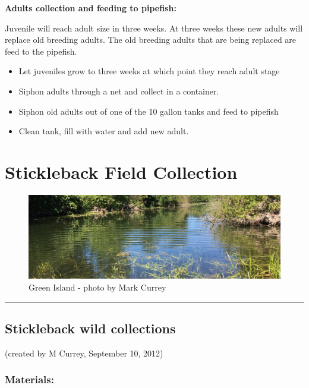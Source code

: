\documentclass[
]{book}
\providecommand{\tightlist}{%
  \setlength{\itemsep}{0pt}\setlength{\parskip}{0pt}}
\begin{document}
\textbf{Adults collection and feeding to pipefish:}

Juvenile will reach adult size in three weeks. At three weeks these new adults will replace old breeding adults. The old breeding adults that are being replaced are feed to the pipefish.

\begin{itemize}
\tightlist
\item
  Let juveniles grow to three weeks at which point they reach adult stage
\item
  Siphon adults through a net and collect in a container.
\item
  Siphon old adults out of one of the 10 gallon tanks and feed to pipefish
\item
  Clean tank, fill with water and add new adult.
\end{itemize}

\hypertarget{stickleback-field-collection}{%
\chapter{Stickleback Field Collection}\label{stickleback-field-collection}}

\begin{figure}
\centering
\includegraphics{images/green_island_header.jpg}
\caption{Green Island - photo by Mark Currey}
\end{figure}

\begin{center}\rule{0.5\linewidth}{0.5pt}\end{center}

\hypertarget{stickleback-wild-collections}{%
\section{Stickleback wild collections}\label{stickleback-wild-collections}}

(created by M Currey, September 10, 2012)

\hypertarget{materials-4}{%
\subsection{Materials:}\label{materials-4}}
\end{document}
